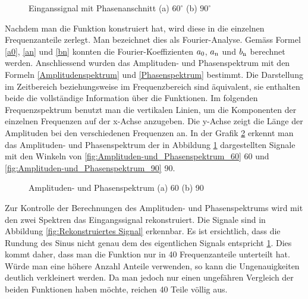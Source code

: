  

\begin{figure}[h]
	\centering
	\qquad
	\caption{Einganssignal mit Phasenanschnitt (a) $60^\circ$ (b) $90^\circ$}
	\label{fig:eingangssignal_mit_Matlab}
\end{figure} 

Nachdem man die Funktion konstruiert hat, wird diese in die einzelnen Frequenzanteile zerlegt. Man bezeichnet dies als Fourier-Analyse. Gemäss Formel \ref{a0}, \ref{an} und \ref{bn} konnten die Fourier-Koeffizienten $a\textsubscript{0}$, $a\textsubscript{n}$ und $b\textsubscript{n}$ berechnet werden. Anschliessend wurden das Amplituden- und Phasenspektrum mit den Formeln \ref{Amplitudenspektrum} und \ref{Phasenspektrum} bestimmt.
\newpage
Die Darstellung im Zeitbereich beziehungsweise im Frequenzbereich sind äquivalent, sie enthalten beide die vollständige Information über die Funktionen. Im folgenden Frequenzspektrum benutzt man die vertikalen Linien, um die Komponenten der einzelnen Frequenzen auf der x-Achse anzugeben. Die y-Achse zeigt die Länge der Amplituden bei den verschiedenen Frequenzen an. In der Grafik \ref{fig:Amplituden- und Phasenspektrum} erkennt man das Amplituden- und Phasenspektrum der in Abbildung \ref{fig:eingangssignal_mit_Matlab} dargestellten Signale mit den Winkeln von \ref{fig:Amplituden-und_Phasenspektrum_60} 60\textdegree \hspace{0.02cm} und \ref{fig:Amplituden-und_Phasenspektrum_90} 90\textdegree \hspace{0.02cm}.

\begin{figure}[h]
	\centering
	\qquad
	\caption{Amplituden- und Phasenspektrum (a) 60\textdegree \hspace{0.02cm} (b) 90\textdegree}
	\label{fig:Amplituden- und Phasenspektrum}
\end{figure} 

Zur Kontrolle der Berechnungen des Amplituden- und Phasenspektrums wird mit den zwei Spektren das Eingangssignal rekonstruiert. Die Signale sind in Abbildung \ref{fig:Rekonstruiertes Signal} erkennbar. Es ist ersichtlich, dass die Rundung des Sinus nicht genau dem des eigentlichen Signals entspricht \ref{fig:eingangssignal_mit_Matlab}. Dies kommt daher, dass man die Funktion  \grqq nur\grqq\hspace{0.02cm} in 40 Frequenzanteile unterteilt hat. Würde man eine höhere Anzahl Anteile verwenden, so kann die Ungenauigkeiten deutlich verkleinert werden. Da man jedoch nur einen ungefähren Vergleich der beiden Funktionen haben möchte, reichen 40 Teile völlig aus.

